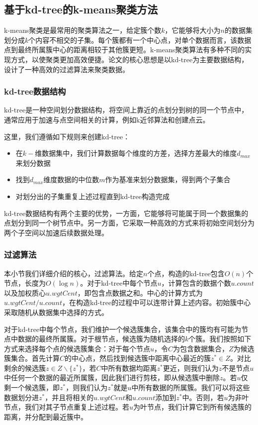 \subsection{基于kd-tree的k-means聚类方法}
k-means聚类是最常用的聚类算法之一，给定簇个数$ k $，它能够将大小为$ n $的数据集划分成$ k $个内容不相交的子集。每个簇都有一个中心点，对单个数据而言，该数据点到最终所属簇中心的距离相较于其他簇更短。k-means聚类算法有多种不同的实现方式，以使聚类更加高效便捷。\cite{kanungo2002efficient}论文的核心思想是以kd-tree为主要数据结构，设计了一种高效的过滤算法来聚类数据。

\subsubsection{kd-tree数据结构}
kd-tree是一种空间划分数据结构，将空间上靠近的点划分到树的同一个节点中\cite{el2020kd}，通常应用于加速与点空间相关的计算，例如k近邻算法和创建点云。

这里，我们遵循如下规则来创建kd-tree：
\begin{itemize}
	\item 在$ k- $维数据集中，我们计算数据每个维度的方差，选择方差最大的维度$ d_{max} $来划分数据
	\item 找到$ d_{max} $维度数据的中位数$ m $作为基准来划分数据集，得到两个子集合
	\item 对划分出的子集重复上述过程直到kd-tree构造完成
\end{itemize}

kd-tree数据结构有两个主要的优势，一方面，它能够将可能属于同一个数据集的点划分到同一个树节点中。另一方面，它采取一种高效的方式来将初始空间划分为两个子空间以加速后续数据处理。

\subsubsection{过滤算法}
本小节我们详细介绍\cite{kanungo2002efficient}的核心，过滤算法。给定$ n $个点，构造的kd-tree包含$ O(n) $个节点，长度为$ O(\log n) $。对于kd-tree中每个节点$ u $，计算包含的数据个数$ u.count $以及加权质心$ u.wgtCent $，即包含点数据之和。中心的计算方式为$ u.wgtCent/u.count $，在构造kd-tree的过程中可以连带计算上述内容。初始簇中心采取随机从数据集中选择的方式。

对于kd-tree中每个节点，我们维护一个候选簇集合，该集合中的簇均有可能为节点中数据的最终所属簇。对于根节点，候选簇为随机选择的$ k $个簇。我们按照如下方式来选择每个点的候选簇集合：对于每个节点$ u $，令$ C $为包含数据集合，$ Z $为候选簇集合。首先计算$ C $的中心点，然后找到候选簇中距离中心最近的簇$ z^*\in Z $。对比剩余的候选簇$ z\in Z\backslash\{z^*\} $，若$ C $中所有数据均距离$ z^* $更近，则我们认为$ z $不是节点$ u $中任何一个数据的最近所属簇，因此我们进行剪枝，即从候选簇中删除$ z $。若$ u $仅剩一个候选簇，即$ z^* $，则我们认为$ z^* $就是$ u $中所有数据的所属簇。我们可以将这些数据划分进$ z^* $，并且将相关的$ u.wgtCent $和$ u.count $添加到$ z^* $中。否则，若$ u $为非叶节点，我们对其子节点重复上述过程。若$ u $为叶节点，我们计算它到所有候选簇的距离，并分配到最近簇中。
